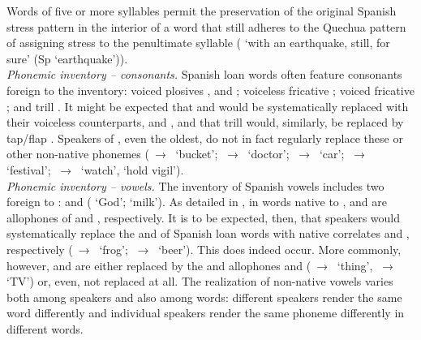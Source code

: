 {Words of five or more syllables permit the preservation of the original Spanish stress pattern in the interior of a word that still adheres to the Quechua pattern of assigning stress to the penultimate syllable ( ‘with an earthquake, still, for sure’ (Sp  ‘earthquake’)).\\

\noindent
\textit{Phonemic inventory -- consonants.} Spanish loan words often feature consonants foreign to the \SYQ{} inventory: voiced plosives ,  and ; voiceless fricative ; voiced fricative ; and trill . It might be expected that \textipa{[b]} and \textipa{[d]} would be systematically replaced with their voiceless counterparts, \textipa{[p]} and \textipa{[t]}, and that trill \textipa{[r]} would, similarly, be replaced by tap/flap \textipa{[ɾ]}. Speakers of \SYQ, even the oldest, do not in fact regularly replace these or other non-native phonemes (~→~ ‘bucket’; ~→~ ‘doctor’; ~→~ ‘car’; ~→~ ‘festival’; ~→~ ‘watch’, ‘hold vigil’).\\

\noindent
\textit{Phonemic inventory -- vowels.} The inventory of Spanish vowels includes two foreign to \SYQ{}:  and  ( ‘God’;  ‘milk’). As detailed in , in words native to \SYQ, \textipa{[o]} and \textipa{[e]} are allophones of  and , respectively. It is to be expected, then, that speakers would systematically replace the \textipa{[o]} and \textipa{[e]} of Spanish loan words with native correlates \textipa{[u]} and \textipa{[i]}, respectively (~→~ ‘frog’; ~→~ ‘beer’). This does indeed occur. More commonly, however, \textipa{[o]} and \textipa{[e]} are either replaced by the  and  allophones \textipa{[υ]} and \textipa{[ɪ]} (~→~\textipa{[kυsa]} ‘thing’, ~→~\textipa{[tɪlɪ]} ‘TV’) or, even, not replaced at all. The realization of non-native vowels varies both among speakers and also among words: different speakers render the same word differently and individual speakers render the same phoneme differently in different words.\\

}
